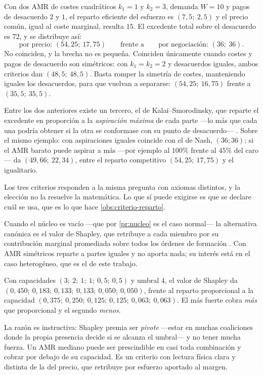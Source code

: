 \begin{observacion}
\label{obs:precio-vs-negociacion}
Con dos AMR de costes cuadráticos $k_1=1$ y $k_2=3$, demanda $W=10$ y pagos de
desacuerdo $2$ y $1$, el reparto eficiente del esfuerzo es $(7{,}5;\ 2{,}5)$ y el
precio común, igual al coste marginal, resulta $15$. El excedente total sobre el
desacuerdo es $72$, y se distribuye así:
\[
  \text{por precio: }(54{,}25;\ 17{,}75)
  \qquad\text{frente a}\qquad
  \text{por negociación: }(36;\ 36).
\]
No coinciden, y la brecha no es pequeña. Coinciden únicamente cuando costes y
pagos de desacuerdo son simétricos: con $k_1=k_2=2$ y desacuerdos iguales, ambos
criterios dan $(48{,}5;\ 48{,}5)$. Basta romper la simetría de costes,
manteniendo iguales los desacuerdos, para que vuelvan a separarse:
$(54{,}25;\ 16{,}75)$ frente a $(35{,}5;\ 35{,}5)$.
\end{observacion}

\begin{observacion}
\label{obs:kalai}
Entre los dos anteriores existe un tercero, el de Kalai--Smorodinsky, que reparte
el excedente en proporción a la \emph{aspiración máxima} de cada parte —lo más que
cada una podría obtener si la otra se conformase con su punto de desacuerdo—
\cite{clempner2024optimization}. Sobre el mismo ejemplo: con aspiraciones iguales
coincide con el de Nash, $(36;36)$; si el AMR barato puede aspirar a más —por
ejemplo al $100\%$ frente al $45\%$ del caro— da $(49{,}66;\ 22{,}34)$, entre el
reparto competitivo $(54{,}25;\ 17{,}75)$ y el igualitario.

Los tres criterios responden a la misma pregunta con axiomas distintos, y la
elección no la resuelve la matemática. Lo que sí puede exigirse es que se declare
cuál se usa, que es lo que hace \cref{obs:criterio-reparto}.
\end{observacion}

\begin{observacion}
\label{obs:shapley}
Cuando el núcleo es vacío —que por \cref{pr:nucleo} es el caso normal— la
alternativa canónica es el valor de Shapley, que retribuye a cada miembro por su
contribución marginal promediada sobre todos los órdenes de formación
\cite{okada2026games}. Con AMR simétricos reparte a partes iguales y no aporta
nada; su interés está en el caso heterogéneo, que es el de este trabajo.

Con capacidades $(3;\ 2;\ 1;\ 1;\ 0{,}5;\ 0{,}5)$ y umbral $4$, el valor de
Shapley da $(0{,}450;\ 0{,}183;\ 0{,}133;\ 0{,}133;\ 0{,}050;\ 0{,}050)$, frente
al reparto proporcional a la capacidad
$(0{,}375;\ 0{,}250;\ 0{,}125;\ 0{,}125;\ 0{,}063;\ 0{,}063)$. El más fuerte cobra
\emph{más} que proporcional y el segundo \emph{menos}.

La razón es instructiva: Shapley premia ser \emph{pivote} —estar en muchas
coaliciones donde la propia presencia decide si se alcanza el umbral— y no tener
mucha fuerza. Un AMR mediano puede ser prescindible en casi toda combinación y
cobrar por debajo de su capacidad. Es un criterio con lectura física clara y
distinta de la del precio, que retribuye por esfuerzo aportado al margen.
\end{observacion}


